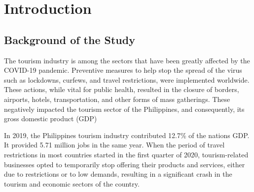 \documentclass[journal]{./IEEE/IEEEtran}
\title{\SPTITLE}
\author{\ADVISEE~and~\ADVISER%
\REMARK}
\begin{document}
\maketitle



\section{Introduction}

\subsection{Background of the Study}
The tourism industry is among the sectors that have been greatly affected by the COVID-19 pandemic.\cite{one:ugur2020impacts}
Preventive measures to help stop the spread of the virus such as lockdowns, curfews, and travel restrictions, were implemented worldwide. 
These actions, while vital for public health, resulted in the closure of borders, airports, hotels, 
transportation, and other forms of mass gatherings. These negatively impacted the tourism sector of the Philippines, 
and consequently, its gross domestic product (GDP)

In 2019, the Philippines tourism industry contributed 12.7\%  of the nations GDP. It provided 5.71 million jobs 
in the same year. When the period of travel restrictions in most countries started in the first quarter of 2020, 
tourism-related businesses opted to temporarily stop offering their products and services, either due to restrictions or to low demands, resulting in a significant crash in the tourism and economic sectors of the country. \cite{two:pwc-tourism-covid19}
\end{document}
